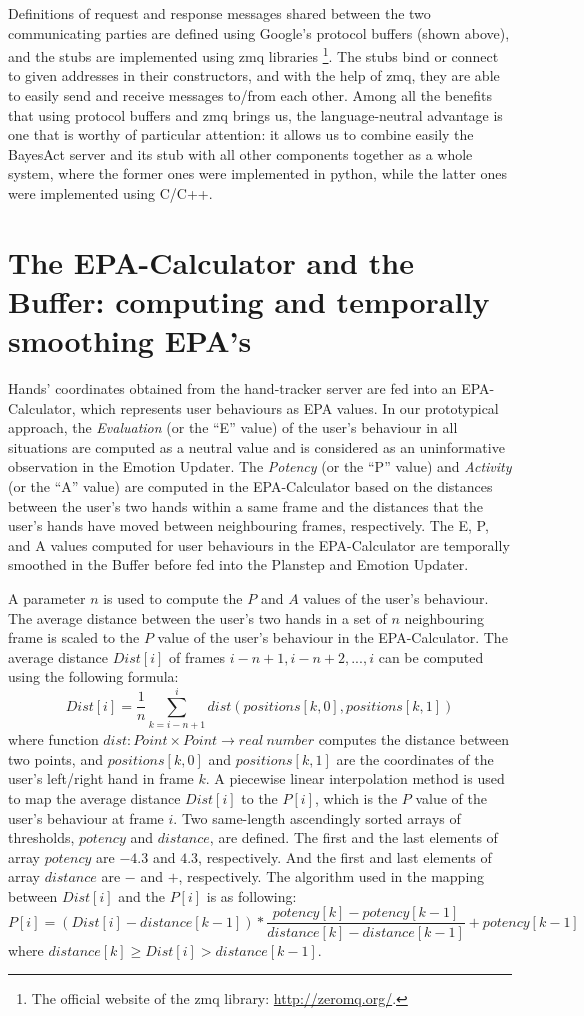 Definitions of request and response messages shared between the two communicating parties are defined using Google's protocol buffers (shown above), and the stubs are implemented using zmq libraries \footnote{The official website of the zmq library: \url{http://zeromq.org/}.}. The stubs bind or connect to given addresses in their constructors, and with the help of zmq, they are able to easily send and receive messages to/from each other. Among all the benefits that using protocol buffers and zmq brings us, the language-neutral advantage is one that is worthy of particular attention: it allows us to combine easily the BayesAct server and its stub with all other components together as a whole system, where the former ones were implemented in python, while the latter ones were implemented using C/C++.


\section{The EPA-Calculator and the Buffer: computing and temporally smoothing EPA's}

Hands' coordinates obtained from the hand-tracker server are fed into an EPA-Calculator, which represents user behaviours as EPA values. In our prototypical approach, the \textit{Evaluation} (or the ``E'' value) of the user's behaviour in all situations are computed as a neutral value and is considered as an uninformative observation in the Emotion Updater. The \textit{Potency} (or the ``P'' value) and \textit{Activity} (or the ``A'' value) are computed in the EPA-Calculator based on the distances between the user's two hands within a same frame and the distances that the user's hands have moved between neighbouring frames, respectively. The E, P, and A values computed for user behaviours in the EPA-Calculator are temporally smoothed in the Buffer before fed into the Planstep and Emotion Updater.

A parameter $n$ is used to compute the $P$ and $A$ values of the user's behaviour. The average distance between the user's two hands in a set of $n$ neighbouring frame is scaled to the $P$ value of the user's behaviour in the EPA-Calculator. The average distance $Dist[i]$ of frames $i-n+1, i-n+2, ... , i$ can be computed using the following formula:
$$Dist[i]=\dfrac{1}{n} \sum_{k=i-n+1}^{i}dist(positions[k,0],positions[k,1])$$
where function $dist: Point \times Point \to real\ number$ computes the distance between two points, and $positions[k,0]$ and $positions[k,1]$ are the coordinates of the user's left/right hand in frame $k$. A piecewise linear interpolation method is used to map the average distance $Dist[i]$ to the $P[i]$, which is the $P$ value of the user's behaviour at frame $i$. Two same-length ascendingly sorted arrays of thresholds, $potency$ and $distance$, are defined. The first and the last elements of array $potency$ are $-4.3$ and $4.3$, respectively. And the first and last elements of array $distance$ are $-$ and $+$, respectively. The algorithm used in the mapping between $Dist[i]$ and the $P[i]$ is as following:
$$P[i]=(Dist[i]-distance[k-1]) * \dfrac{potency[k]-potency[k-1]}{distance[k]-distance[k-1]} + potency[k-1]$$
where $distance[k] \geq Dist[i]>distance[k-1]$.

